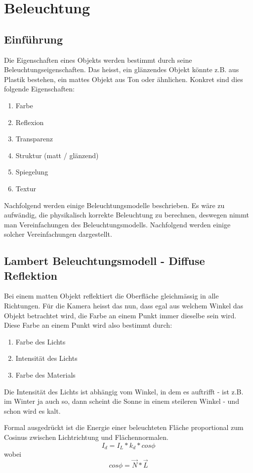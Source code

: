 \chapter{Beleuchtung}

\section{Einführung}
Die Eigenschaften eines Objekts werden bestimmt durch seine Beleuchtungseigenschaften. Das heisst, ein glänzendes Objekt könnte z.B. aus Plastik bestehen, ein mattes Objekt aus Ton oder ähnlichen. Konkret sind dies folgende Eigenschaften:
\begin{enumerate}
	\item Farbe
	\item Reflexion
	\item Transparenz
	\item Struktur (matt / glänzend)
	\item Spiegelung
	\item Textur
\end{enumerate}
Nachfolgend werden einige Beleuchtungsmodelle beschrieben. Es wäre zu aufwändig, die physikalisch korrekte Beleuchtung zu berechnen, deswegen nimmt man Vereinfachungen des Beleuchtungsmodells. Nachfolgend werden einige solcher Vereinfachungen dargestellt.
\section{Lambert Beleuchtungsmodell - Diffuse Reflektion}

Bei einem matten Objekt reflektiert die Oberfläche gleichmässig in alle Richtungen. Für die Kamera heisst das nun, dass egal aus welchem Winkel das Objekt betrachtet wird, die Farbe an einem Punkt immer dieselbe sein wird. Diese Farbe an einem Punkt wird also bestimmt durch:
\begin{enumerate}
	\item Farbe des Lichts
	\item Intensität des Lichts
	\item Farbe des Materials
\end{enumerate}
Die Intensität des Lichts ist abhängig vom Winkel, in dem es auftrifft - ist z.B. im Winter ja auch so, dann scheint die Sonne in einem steileren Winkel - und schon wird es kalt.

Formal ausgedrückt ist die Energie einer beleuchteten Fläche proportional zum Cosinus zwischen Lichtrichtung und Flächennormalen.
\begin{displaymath}
I_d = I_L * k_d * cos \phi
\end{displaymath}
wobei 
\begin{displaymath}
cos \phi = \vec{N}*\vec{L}
\end{displaymath}

